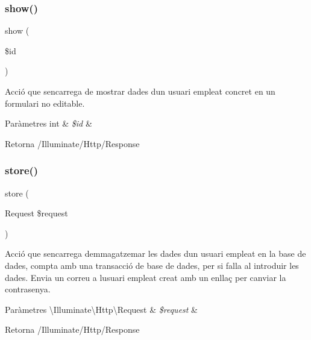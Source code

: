 \subsubsection{\texorpdfstring{show()}{show()}}
{\footnotesize\ttfamily show (\begin{DoxyParamCaption}\item[{}]{\$id }\end{DoxyParamCaption})}

Acció que s\textquotesingle{}encarrega de mostrar dades d\textquotesingle{}un usuari empleat concret en un formulari no editable.


\begin{DoxyParams}[1]{Paràmetres}
int & {\em \$id} & \\
\hline
\end{DoxyParams}
\begin{DoxyReturn}{Retorna}
/\+Illuminate/\+Http/\+Response 
\end{DoxyReturn}
\mbox{\label{class_app_1_1_http_1_1_controllers_1_1_empleats_controller_a9ef485163104597c12185b53cdacf638}} 
\subsubsection{\texorpdfstring{store()}{store()}}
{\footnotesize\ttfamily store (\begin{DoxyParamCaption}\item[{Request}]{\$request }\end{DoxyParamCaption})}

Acció que s\textquotesingle{}encarrega d\textquotesingle{}emmagatzemar les dades d\textquotesingle{}un usuari empleat en la base de dades, compta amb una transacció de base de dades, per si falla al introduir les dades. Envia un correu a l\textquotesingle{}usuari empleat creat amb un enllaç per canviar la contrasenya.


\begin{DoxyParams}[1]{Paràmetres}
\textbackslash{}\+Illuminate\textbackslash{}\+Http\textbackslash{}\+Request & {\em \$request} & \\
\hline
\end{DoxyParams}
\begin{DoxyReturn}{Retorna}
/\+Illuminate/\+Http/\+Response 
\end{DoxyReturn}
\mbox{\label{class_app_1_1_http_1_1_controllers_1_1_empleats_controller_a27e5c7c270aebe0baec29a042d450df4}} 
